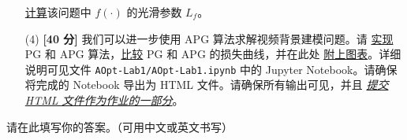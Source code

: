 \begin{enumerate}
  \underline{计算}该问题中 $f(\cdot)$ 的光滑参数 $L_f$。

  \item[(4)] \textbf{[40 分]} 我们可以进一步使用 APG 算法求解视频背景建模问题。请 \underline{实现} PG 和 APG 算法，\underline{比较} PG 和 APG 的损失曲线，并在此处 \underline{附上图表}。详细说明可见文件 \texttt{AOpt-Lab1/AOpt-Lab1.ipynb} 中的 Jupyter Notebook。请确保将完成的 Notebook 导出为 HTML 文件。请确保所有输出可见，并且 \underline{\emph{提交 HTML 文件作为作业的一部分}}。
\end{enumerate}
\begin{solution}
请在此填写你的答案。（可用中文或英文书写）
~\\
~\\
~\\
\end{solution}
